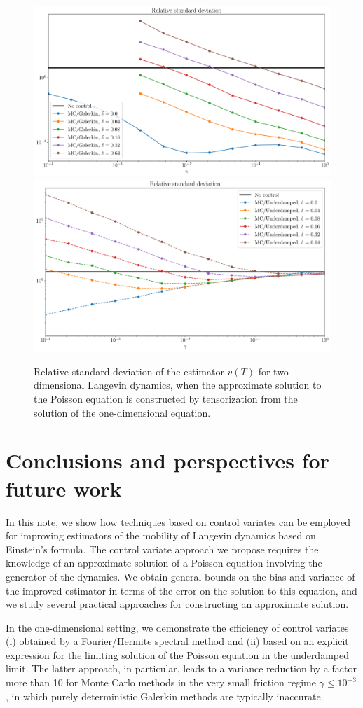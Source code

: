\documentclass[11pt,a4paper]{article}
\theoremstyle{plain}
\numberwithin{equation}{section}
\renewcommand{\leq}{\leqslant}
\begin{document}
\begin{figure}[ht]
    \centering
    \includegraphics[width=0.49\linewidth]{figures/var-delta-galerkin.pdf}
    \includegraphics[width=0.49\linewidth]{figures/var-delta-underdamped.pdf}
    \caption{
        Relative standard deviation of the estimator $v(T)$ for two-dimensional Langevin dynamics,
        when the approximate solution to the Poisson equation is constructed by tensorization from the solution of the one-dimensional equation.
    }%
    \label{fig:time_bias_deviation_2d}
\end{figure}

\section{Conclusions and perspectives for future work}%
\label{sec:conclusions_and_perspectives_for_future_work}
In this note,
we show how techniques based on control variates can be employed for improving estimators of the mobility of Langevin dynamics based on Einstein's formula.
The control variate approach we propose requires the knowledge of an approximate solution of a Poisson equation involving the generator of the dynamics.
We obtain general bounds on the bias and variance of the improved estimator in terms of the error on the solution to this equation,
and we study several practical approaches for constructing an approximate solution.

In the one-dimensional setting,
we demonstrate the efficiency of control variates
(i) obtained by a Fourier/Hermite spectral method and
(ii) based on an explicit expression for the limiting solution of the Poisson equation in the underdamped limit.
The latter approach, in particular,
leads to a variance reduction by a factor more than 10 for Monte Carlo methods in the very small friction regime $\gamma \leq 10^{-3}$,
in which purely deterministic Galerkin methods are typically inaccurate.
\end{document}
